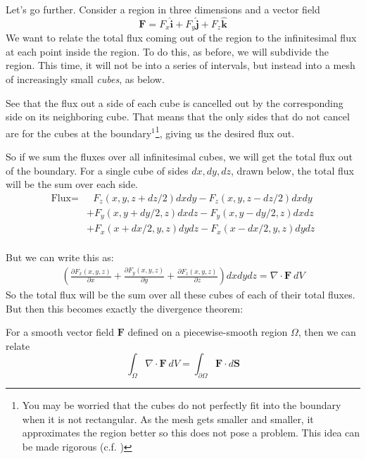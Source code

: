 	Let's go further. Consider a region in three dimensions and a vector field 
	\begin{equation*}
		\mathbf F = F_x \hat{\mathbf{i}} + F_y \hat{\mathbf j} + F_z \hat{\mathbf k}
	\end{equation*} 
	We want to relate the total flux coming out of the region to the infinitesimal flux at each point inside the region. To do this, as before, we will subdivide the region. This time, it will not be into a series of intervals, but instead into a mesh of increasingly small \emph{cubes}, as below.
	
	
	See that the flux out a side of each cube is cancelled out by the corresponding side on its neighboring cube. That means that the only sides that do not cancel are for the cubes at the boundary$^1$\footnote{You may be worried that the cubes do not perfectly fit into the boundary when it is not rectangular. As the mesh gets smaller and smaller, it approximates the region better so this does not pose a problem. This idea can be made rigorous (c.f. )}, giving us the desired flux out.
	
	So if we sum the fluxes over all infinitesimal cubes, we will get the total flux out of the boundary. For a single cube of sides $dx,dy,dz$, drawn below, the total flux will be the sum over each side. 
	\begin{align*}
		\text{Flux} =&~~~  F_z(x,y,z+dz/2) dx dy -  F_z(x,y,z-dz/2) dx dy \\ 
						   & + F_y (x,y+dy/2,z) dx dz - F_y (x,y-dy/2,z) dx dz \\ 
						   & + F_x (x+dx/2,y,z) dy dz - F_x (x-dx/2,y,z) dy dz \\ 
	\end{align*}
	
	But we can write this as: 
	\begin{align*}
		\left( \frac{\partial F_x (x,y,z)}{\partial x} + \frac{\partial F_y (x,y,z)}{\partial y} + \frac{\partial F_z(x,y,z)}{\partial z} \right) dx dy dz = \nabla \cdot \mathbf F ~ dV
	\end{align*}
	So the total flux will be the sum over all these cubes of each of their total fluxes. But then this becomes exactly the divergence theorem:
	\begin{theorem}
	For a smooth vector field $\mathbf F$ defined on a piecewise-smooth region $\Omega$, then we can relate
		\begin{equation*}
			\int_\Omega \nabla \cdot \mathbf F ~ dV = \int_{\partial \Omega} \mathbf{F} \cdot d \mathbf S
		\end{equation*}
	\end{theorem}
	
